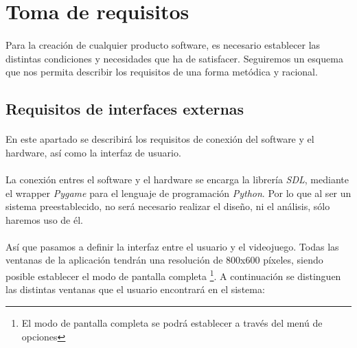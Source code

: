 \section{Toma de requisitos}

\paragraph{}
Para la creación de cualquier producto software, es necesario establecer las distintas condiciones y necesidades que
ha de satisfacer. Seguiremos un esquema que nos permita describir los requisitos de una forma metódica y racional.

\subsection{Requisitos de interfaces externas}

\paragraph{}
En este apartado se describirá los requisitos de conexión del software y el hardware, así como la interfaz de usuario.

\paragraph{}
La conexión entres el software y el hardware se encarga la librería \emph{SDL}, mediante el wrapper \emph{Pygame} para 
el lenguaje de programación \emph{Python}. Por lo que al ser un sistema preestablecido, no será necesario realizar el diseño,
ni el análisis, sólo haremos uso de él.

\paragraph{}
Así que pasamos a definir la interfaz entre el usuario y el videojuego. Todas las ventanas de la aplicación tendrán una 
resolución de 800x600 píxeles, siendo posible establecer el modo de pantalla completa \footnote{El modo de pantalla completa
se podrá establecer a través del menú de opciones}. A continuación se distinguen las distintas
ventanas que el usuario encontrará en el sistema:


